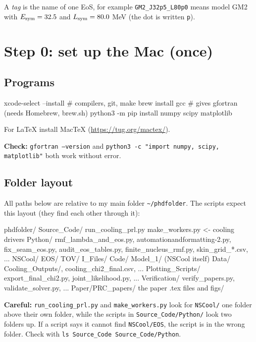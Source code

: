 \documentclass[11pt,a4paper]{article}
\newcommand{\Esym}{E_{\rm sym}}
\newcommand{\Lsym}{L_{\rm sym}}
\newcommand{\f}[1]{\texttt{#1}}
\newcommand{\ok}[1]{\par\noindent\textcolor{okc}{\textbf{Check:}} #1\par}
\newcommand{\warn}[1]{\par\noindent\textcolor{warnc}{\textbf{Careful:}} #1\par}
\begin{document}
\noindent A \emph{tag} is the name of one EoS, for example \f{GM2\_J32p5\_L80p0} means model GM2 with $\Esym=32.5$ and $\Lsym=80.0$ MeV (the dot is written \f{p}).

\section{Step 0: set up the Mac (once)}

\subsection{Programs}
\begin{cmd}
xcode-select --install                 # compilers, git, make
brew install gcc            # gives gfortran (needs Homebrew, brew.sh)
python3 -m pip install numpy scipy matplotlib
\end{cmd}
For LaTeX install MacTeX (\url{https://tug.org/mactex/}).
\ok{\f{gfortran --version} and \f{python3 -c "import numpy, scipy, matplotlib"} both work without error.}

\subsection{Folder layout}
All paths below are relative to my main folder \f{\textasciitilde/phdfolder}. The scripts expect this layout (they find each other through it):
\begin{cmd}
phdfolder/
  Source_Code/
    run_cooling_prl.py   make_workers.py        <- cooling drivers
    Python/              rmf_lambda_and_eos.py, automationandformatting-2.py,
                         fix_seam_eos.py, audit_eos_tables.py,
                         finite_nucleus_rmf.py, skin_grid_*.csv, ...
  NSCool/                EOS/  TOV/  I_Files/  Code/  Model_1/  (NSCool itself)
  Data/                  Cooling_Outputs/, cooling_chi2_final.csv, ...
  Plotting_Scripts/      export_final_chi2.py, joint_likelihood.py, ...
  Verification/          verify_papers.py, validate_solver.py, ...
  Paper/PRC_papers/      the paper .tex files and figs/
\end{cmd}
\warn{\f{run\_cooling\_prl.py} and \f{make\_workers.py} look for \f{NSCool/} one folder above their own folder, while the scripts in \f{Source\_Code/Python/} look two folders up. If a script says it cannot find \f{NSCool/EOS}, the script is in the wrong folder. Check with \f{ls Source\_Code Source\_Code/Python}.}
\end{document}

